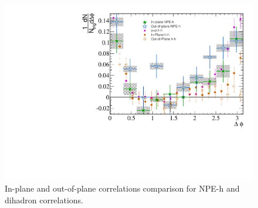 \begin{figure}[htbp]
\begin{center}
\includegraphics[scale=.75]{Plots/Correlations/EP/NPE_subtracted_eh_corr_in-out_comp_with_pub_primpt_4_5_cent_2_5_assopt_3_4.pdf}
\end{center}
\caption[Event Plane Dependent Correlation Comparison]{In-plane and out-of-plane correlations comparison for NPE-h and dihadron correlations.}
\label{fig:EP_comparison}
\end{figure}


